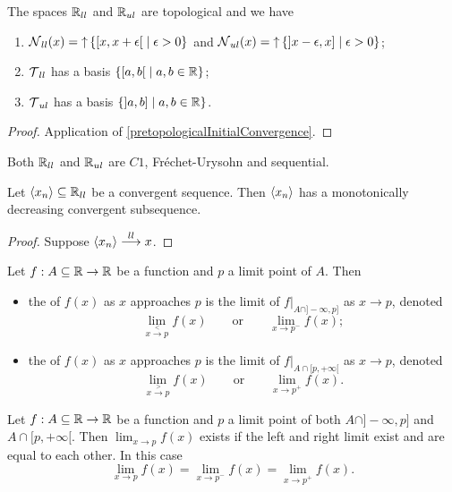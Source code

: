 \begin{proposition}
The spaces $\mathbb{R}_{ll}$ and $\mathbb{R}_{ul}$ are topological and we have
\begin{enumerate}
\item $\neighbourhood_{ll}(x) = \upset \setbuilder{\interval[co]{x,x+\epsilon}}{\epsilon > 0}$ and $\neighbourhood_{ul}(x) = \upset \setbuilder{\interval[oc]{x-\epsilon, x}}{\epsilon > 0}$;
\item $\operatorname{\mathcal{T}}_{ll}$ has a basis $\setbuilder{\interval[co]{a,b}}{a,b\in \R}$;
\item $\operatorname{\mathcal{T}}_{ul}$ has a basis $\setbuilder{\interval[oc]{a,b}}{a,b\in \R}$.
\end{enumerate}
\end{proposition}
\begin{proof}
Application of \ref{pretopologicalInitialConvergence}.
\end{proof}
\begin{corollary} \label{SorgenfreyLineC1}
Both $\mathbb{R}_{ll}$ and $\mathbb{R}_{ul}$ are $C1$, Fréchet-Urysohn and sequential.
\end{corollary}

\begin{lemma}
Let $\left\langle x_n \right\rangle\subseteq \mathbb{R}_{ll}$ be a convergent sequence. Then $\left\langle x_n \right\rangle$ has a monotonically decreasing convergent subsequence.
\end{lemma}
\begin{proof}
Suppose $\left\langle x_n \right\rangle \overset{ll}{\longrightarrow} x$.
\end{proof}

\begin{definition}
Let $f:A\subseteq\mathbb{R}\to\mathbb{R}$ be a function and $p$ a limit point of $A$. Then
\begin{itemize}
\item the  of $f(x)$ as $x$ approaches $p$ is the limit of $f|_{A\cap]-\infty,p]}$ as $x\to p$, denoted
\[ \lim_{x\overset{<}{\to} p}f(x) \qquad \text{or} \qquad \lim_{x\to p^-}f(x); \]
\item the  of $f(x)$ as $x$ approaches $p$ is the limit of $f|_{A\cap[p,+\infty[}$ as $x\to p$, denoted
\[ \lim_{x\overset{>}{\to} p}f(x) \qquad \text{or} \qquad \lim_{x\to p^+}f(x). \]
\end{itemize}
\end{definition}
\begin{lemma}
Let $f:A\subseteq\mathbb{R}\to\mathbb{R}$ be a function and $p$ a limit point of both $A\cap]-\infty,p]$ and $A\cap[p,+\infty[$. Then $\lim_{x\to p} f(x)$ exists if the left and right limit exist and are equal to each other. In this case
\[ \lim_{x\to p} f(x) = \lim_{x\to p^-} f(x) = \lim_{x\to p^+} f(x). \]
\end{lemma}

